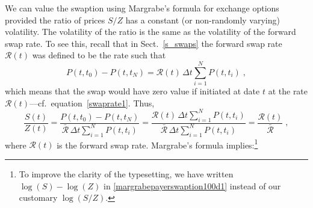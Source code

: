We can value the swaption using Margrabe's formula for exchange options  provided the ratio of prices $S/Z$ has a constant (or non-randomly varying) volatility.  The volatility of the ratio is the same as the volatility of the forward swap rate.  To see this, recall that 
in Sect.~\ref{s_swaps} the forward swap rate $\mathcal{R}(t)$ was defined to be the rate such that 
$$P(t,t_0)- P(t,t_N) = \mathcal{R}(t)\,\varDelta t \sum_{i=1}^N P(t,t_i)\; ,$$
which means that the swap would have zero value if initiated at date $t$ at the rate $\mathcal{R}(t)$---cf.\ equation~\eqref{swaprate1}.  Thus,
\begin{equation*}
\frac{S(t)}{Z(t)} = \frac{P(t,t_0)- P(t,t_N)}{\bar{\mathcal{R}}\,\varDelta t \sum_{i=1}^N P(t,t_i)} = \frac{\mathcal{R}(t)\,\varDelta t \sum_{i=1}^N P(t,t_i)}{\bar{\mathcal{R}}\,\varDelta t \sum_{i=1}^N P(t,t_i)} = \frac{\mathcal{R}(t)}{\bar{\mathcal{R}}}\;,
\end{equation*}
where $\mathcal{R}(t)$ is the forward swap rate.  
Margrabe's formula implies:\footnote{To improve the clarity of the typesetting, we have written  $\log(S)-\log(Z)$ in   \eqref{margrabepayerswaption100d1} instead of our customary $\log(S/Z)$.}


